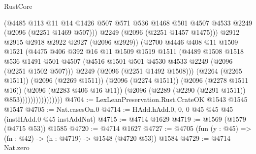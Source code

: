 \begin{lexlean}{RustCore}
\begin{coremodule}
                                (@4485
                                  @113
                                  @11
                                  @14
                                  @1426
                                  @507
                                  @571
                                  @536
                                  @1468
                                  @501
                                  @4507
                                  @4533
                                  @2249
                                  (@2096 (@2251 @1469 @507)))
                                @2249
                                (@2096 (@2251 @1457 @1475)))
                              @2912
                              @2915
                              @2918
                              @2922
                              @2927
                              (@2096 @2929))
                            (@2700
                              @4446
                              @408
                              @11
                              @1509
                              @1521
                              (@4475
                                @406
                                @392
                                @16
                                @11
                                @1509
                                @1519
                                @1511
                                (@4489
                                  @1508
                                  @1518
                                  @536
                                  @1491
                                  @501
                                  @4507
                                  (@4516 @1501 @501 @4530 @4533 @2249 (@2096 (@2251 @1502 @507)))
                                  @2249
                                  (@2096 (@2251 @1492 @1508)))
                                (@2264 (@2265 @1511))
                                (@2096 (@2269 @1511))
                                (@2096 (@2274 @1511))
                                (@2096 (@2278 @1511 @16))
                                (@2096 (@2283 @406 @16 @11))
                                (@2096 (@2289 (@2290 (@2291 @1511)) @853))))))))))))))))
@4704 := LexLeanPreservation.Rust.CrateOK @1543 @1545 @1547
@4705 := Nat.casesOn.{0}
@4714 := HAdd.hAdd.{0, 0, 0} @45 @45 @45 (instHAdd.{0} @45 instAddNat)
@4715 := @4714 @1629
@4719 := @1569 (@1579 (@4715 @53)) @1585
@4720 := @4714 @1627
@4727 := @4705 (fun (y : @45) => (fn : @42) -> (h : @4719) -> @1548 (@4720 @53)) @1584
@4729 := @4714 Nat.zero

\end{coremodule}
\end{lexlean}
